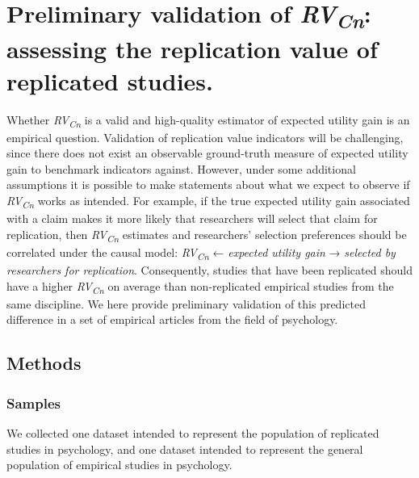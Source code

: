 \documentclass[
  english,
  jou,floatsintext]{apa6}
\begin{document}
\hypertarget{preliminary-validation-of-rvcn-assessing-the-replication-value-of-replicated-studies.}{%
\section{\texorpdfstring{Preliminary validation of \emph{RV\textsubscript{Cn}}: assessing the replication value of replicated studies.}{Preliminary validation of RVCn: assessing the replication value of replicated studies.}}\label{preliminary-validation-of-rvcn-assessing-the-replication-value-of-replicated-studies.}}

Whether \emph{RV\textsubscript{Cn}} is a valid and high-quality estimator of expected utility gain is an empirical question. Validation of replication value indicators will be challenging, since there does not exist an observable ground-truth measure of expected utility gain to benchmark indicators against. However, under some additional assumptions it is possible to make statements about what we expect to observe if \emph{RV\textsubscript{Cn}} works as intended. For example, if the true expected utility gain associated with a claim makes it more likely that researchers will select that claim for replication, then \emph{RV\textsubscript{Cn}} estimates and researchers' selection preferences should be correlated under the causal model: \emph{RV\textsubscript{Cn}} ← \emph{expected utility gain} → \emph{selected by researchers for replication}. Consequently, studies that have been replicated should have a higher \emph{RV\textsubscript{Cn}} on average than non-replicated empirical studies from the same discipline. We here provide preliminary validation of this predicted difference in a set of empirical articles from the field of psychology.

\hypertarget{methods}{%
\subsection{Methods}\label{methods}}

\hypertarget{samples}{%
\subsubsection{Samples}\label{samples}}

We collected one dataset intended to represent the population of replicated studies in psychology, and one dataset intended to represent the general population of empirical studies in psychology.
\end{document}
